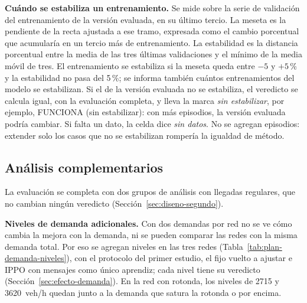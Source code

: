 \noindent\textbf{Cuándo se estabiliza un entrenamiento.} Se mide sobre
la serie de validación del entrenamiento de la versión evaluada, en su
último tercio. La meseta es la pendiente de la recta ajustada a ese
tramo, expresada como el cambio porcentual que acumularía en un tercio
más de entrenamiento. La estabilidad es la distancia porcentual entre la
media de las tres últimas validaciones y el mínimo de la media móvil de
tres. El entrenamiento se estabiliza si la meseta queda entre $-5$ y
$+5$\,\% y la estabilidad no pasa del 5\,\%; se informa también cuántos
entrenamientos del modelo se estabilizan. Si el de la versión evaluada
no se estabiliza, el veredicto se calcula igual, con la evaluación
completa, y lleva la marca \emph{sin estabilizar}, por ejemplo, FUNCIONA
(sin estabilizar): con más episodios, la versión evaluada podría
cambiar. Si falta un dato, la celda dice \emph{sin datos}. No se agregan
episodios: extender solo los casos que no se estabilizan rompería la
igualdad de método.

\subsection{Análisis complementarios}
\label{sec:analisis-complementarios}

La evaluación se completa con dos grupos de análisis con llegadas
regulares, que no cambian ningún veredicto
(Sección~\ref{sec:diseno-segundo}).

\label{sec:plan-demanda}
\noindent\textbf{Niveles de demanda adicionales.} Con dos demandas por
red no se ve cómo cambia la mejora con la demanda, ni se pueden
comparar las redes con la misma demanda total. Por eso se agregan
niveles en las tres redes (Tabla~\ref{tab:plan-demanda-niveles}), con
el protocolo del primer estudio, el fijo vuelto a ajustar e IPPO con
mensajes como único aprendiz; cada nivel tiene su veredicto
(Sección~\ref{sec:efecto-demanda}). En la red con rotonda, los niveles
de 2715 y 3620~veh/h quedan junto a la demanda que satura la rotonda o
por encima.

